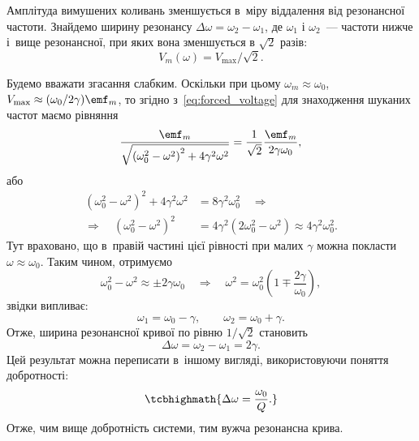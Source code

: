 Амплітуда вимушених коливань зменшується в~міру віддалення від
резонансної частоти. Знайдемо ширину резонансу $\Delta\omega = \omega_2 - \omega_1$, де $\omega_1$ і
$\omega_2$~--- частоти нижче і~вище резонансної, при яких вона зменшується в
$\sqrt{2}$ разів:
\begin{equation*}
	V_m(\omega) = V_{\max}/\sqrt{2}.
\end{equation*}

Будемо вважати згасання слабким. Оскільки при цьому $\omega_m \approx \omega_0$,
$V_{\max} \approx (\omega_0/2\gamma)\emf_m$, то згідно з~\eqref{eq:forced_voltage} для знаходження шуканих частот маємо рівняння
\begin{equation*}
	\frac{\emf_m}{\sqrt{\left(\omega_0^2 - \omega^2\right)^2 + 4\gamma^2\omega^2}}
	= \frac{1}{\sqrt{2}}\frac{\emf_m}{2\gamma\omega_0},
\end{equation*}
або
\begin{equation*}
	\begin{aligned}
		\left(\omega_0^2 - \omega^2\right)^2 + 4\gamma^2\omega^2 & = 8\gamma^2\omega_0^2 \quad\Rightarrow                                      \\
		\Rightarrow\quad \left(\omega_0^2 - \omega^2\right)^2    & = 4\gamma^2\left(2\omega_0^2 - \omega^2\right) \approx 4\gamma^2\omega_0^2.
	\end{aligned}
\end{equation*}
Тут враховано, що в~правій частині цієї рівності при малих $\gamma$ можна
покласти $\omega \approx \omega_0$. Таким чином, отримуємо
\begin{equation*}
	\omega_0^2 - \omega^2 \approx \pm 2\gamma\omega_0
	\quad\Rightarrow\quad
	\omega^2 = \omega_0^2\left(1 \mp \frac{2\gamma}{\omega_0}\right),
\end{equation*}
звідки випливає:
\begin{equation*}
	\omega_1 = \omega_0 - \gamma, \qquad \omega_2 = \omega_0 + \gamma.
\end{equation*}
Отже, ширина резонансної кривої по рівню $1/\sqrt{2}$ становить
\begin{equation*}
	\Delta\omega = \omega_2 - \omega_1 = 2\gamma.
\end{equation*}
Цей результат можна переписати в~іншому вигляді, використовуючи поняття
добротності:
\begin{equation*}
	\tcbhighmath{
		\Delta\omega = \frac{\omega_0}{Q}.
	}
\end{equation*}
Отже, чим вище добротність системи, тим вужча резонансна
крива.

